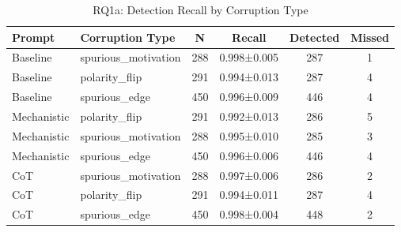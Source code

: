 \begin{table}[htbp]
\centering
\caption{RQ1a: Detection Recall by Corruption Type}
\label{tab:rq1a_corruption_type}
\begin{tabular}{llcccc}
\toprule
\textbf{Prompt} & \textbf{Corruption Type} & \textbf{N} & \textbf{Recall} & \textbf{Detected} & \textbf{Missed} \\
\midrule
Baseline & spurious_motivation & 288 & 0.998±0.005 & 287 & 1 \\
Baseline & polarity_flip & 291 & 0.994±0.013 & 287 & 4 \\
Baseline & spurious_edge & 450 & 0.996±0.009 & 446 & 4 \\
Mechanistic & polarity_flip & 291 & 0.992±0.013 & 286 & 5 \\
Mechanistic & spurious_motivation & 288 & 0.995±0.010 & 285 & 3 \\
Mechanistic & spurious_edge & 450 & 0.996±0.006 & 446 & 4 \\
CoT & spurious_motivation & 288 & 0.997±0.006 & 286 & 2 \\
CoT & polarity_flip & 291 & 0.994±0.011 & 287 & 4 \\
CoT & spurious_edge & 450 & 0.998±0.004 & 448 & 2 \\
\bottomrule
\end{tabular}
\end{table}